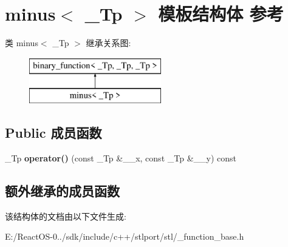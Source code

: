 \hypertarget{structminus}{}\section{minus$<$ \+\_\+\+Tp $>$ 模板结构体 参考}
\label{structminus}
类 minus$<$ \+\_\+\+Tp $>$ 继承关系图\+:\begin{figure}[H]
\begin{center}
\leavevmode
\includegraphics[height=2.000000cm]{structminus}
\end{center}
\end{figure}
\subsection*{Public 成员函数}
\begin{DoxyCompactItemize}
\item 
\mbox{\label{structminus_a8af7cfe23056a88bb54ffa1cf88e8a19}} 
\+\_\+\+Tp {\bfseries operator()} (const \+\_\+\+Tp \&\+\_\+\+\_\+x, const \+\_\+\+Tp \&\+\_\+\+\_\+y) const
\end{DoxyCompactItemize}
\subsection*{额外继承的成员函数}


该结构体的文档由以下文件生成\+:\begin{DoxyCompactItemize}
\item 
E\+:/\+React\+O\+S-\/0../sdk/include/c++/stlport/stl/\+\_\+function\+\_\+base.\+h\end{DoxyCompactItemize}
